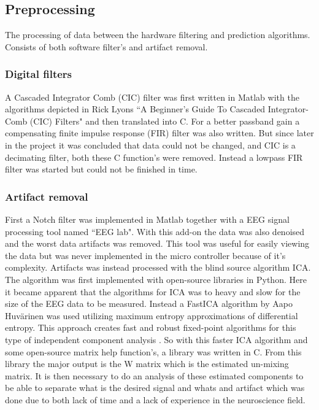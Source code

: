 \subsection{Preprocessing}
The processing of data between the hardware filtering and prediction algorithms. Consists of both software filter's and artifact removal.

\subsubsection{Digital filters}
A Cascaded Integrator Comb (CIC) filter was first written in Matlab with the algorithms depicted in Rick Lyons ``A Beginner's Guide To Cascaded Integrator-Comb (CIC) Filters" \cite{CICguide} and then translated into C. For a better passband gain a compensating finite impulse response (FIR) filter was also written. But since later in the project it was concluded that data could not be changed, and CIC is a decimating filter, both these C function's were removed. Instead a lowpass FIR filter was started but could not be finished in time.

\subsubsection{Artifact removal}
First a Notch filter was implemented in Matlab together with a EEG signal processing tool named ``EEG lab". With this add-on the data was also denoised and the worst data artifacts was removed. This tool was useful for easily viewing the data but was never implemented in the micro controller because of it's complexity. Artifacts was instead processed with the blind source algorithm ICA. The algorithm was first implemented with open-source libraries in Python. Here it became apparent that the algorithms for ICA was to heavy and slow for the size of the EEG data to be measured. Instead a FastICA algorithm by Aapo Huvärinen was used utilizing maximum entropy approximations of differential entropy. This approach creates fast and robust fixed-point algorithms for this type of independent  component analysis \cite{fastICA}. So with this faster ICA algorithm and some open-source matrix help function's, a library was written in C. From this library the major output is the W matrix which is the estimated un-mixing matrix. It is then necessary to do an analysis of these estimated components to be able to separate what is the desired signal and whats and artifact which was done due to both lack of time and a lack of experience in the neuroscience field.

